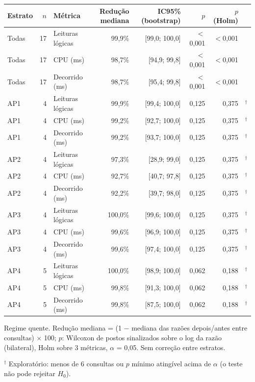 {\small\setlength{\tabcolsep}{4pt}
\begin{tabular}{lrlrrrrl}
\toprule
Estrato & $n$ & Métrica & Redução mediana & IC95\% (bootstrap) & $p$ & $p$ (Holm) &  \\
\midrule
Todas & 17 & Leituras lógicas & 99,9\% & [99,0; 100,0] & $<$0,001 & $<$0,001 &  \\
Todas & 17 & CPU (ms) & 98,7\% & [94,9; 99,8] & $<$0,001 & $<$0,001 &  \\
Todas & 17 & Decorrido (ms) & 98,7\% & [95,4; 99,8] & $<$0,001 & $<$0,001 &  \\
\midrule
AP1 & 4 & Leituras lógicas & 99,9\% & [99,4; 100,0] & 0,125 & 0,375 & $^{\dagger}$ \\
AP1 & 4 & CPU (ms) & 99,2\% & [92,7; 100,0] & 0,125 & 0,375 & $^{\dagger}$ \\
AP1 & 4 & Decorrido (ms) & 99,2\% & [93,7; 100,0] & 0,125 & 0,375 & $^{\dagger}$ \\
\midrule
AP2 & 4 & Leituras lógicas & 97,3\% & [28,9; 99,0] & 0,125 & 0,375 & $^{\dagger}$ \\
AP2 & 4 & CPU (ms) & 92,7\% & [40,7; 97,8] & 0,125 & 0,375 & $^{\dagger}$ \\
AP2 & 4 & Decorrido (ms) & 92,2\% & [39,7; 98,0] & 0,125 & 0,375 & $^{\dagger}$ \\
\midrule
AP3 & 4 & Leituras lógicas & 100,0\% & [99,6; 100,0] & 0,125 & 0,375 & $^{\dagger}$ \\
AP3 & 4 & CPU (ms) & 99,6\% & [96,9; 100,0] & 0,125 & 0,375 & $^{\dagger}$ \\
AP3 & 4 & Decorrido (ms) & 99,6\% & [97,4; 100,0] & 0,125 & 0,375 & $^{\dagger}$ \\
\midrule
AP4 & 5 & Leituras lógicas & 100,0\% & [98,9; 100,0] & 0,062 & 0,188 & $^{\dagger}$ \\
AP4 & 5 & CPU (ms) & 99,8\% & [91,3; 100,0] & 0,062 & 0,188 & $^{\dagger}$ \\
AP4 & 5 & Decorrido (ms) & 99,8\% & [87,5; 100,0] & 0,062 & 0,188 & $^{\dagger}$ \\
\bottomrule
\end{tabular}\par
\vspace{3pt}
\begin{minipage}{\linewidth}\footnotesize
Regime quente. Redução mediana = (1 $-$ mediana das razões depois/antes entre consultas) $\times$ 100; $p$: Wilcoxon de postos sinalizados sobre o log da razão (bilateral), Holm sobre 3 métricas, $\alpha$ = 0,05. Sem correção entre estratos.\par
$^{\dagger}$ Exploratório: menos de 6 consultas ou $p$ mínimo atingível acima de $\alpha$ (o teste não pode rejeitar $H_0$).
\end{minipage}
}
